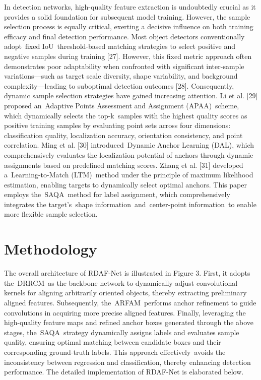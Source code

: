 \documentclass[journal]{IEEEtran}
\begin{document}
In detection networks, high-quality feature extraction is undoubtedly crucial as it provides a solid foundation for subsequent model training. However, the sample selection process is equally critical, exerting a decisive influence on both training efficacy and final detection performance. Most object detectors conventionally adopt fixed IoU threshold-based matching strategies to select positive and negative samples during training [27]. However, this fixed metric approach often demonstrates poor adaptability when confronted with significant inter-sample variations—such as target scale diversity, shape variability, and background complexity—leading to suboptimal detection outcomes [28]. Consequently, dynamic sample selection strategies have gained increasing attention. Li et al. [29] proposed an Adaptive Points Assessment and Assignment (APAA) scheme, which dynamically selects the top-k samples with the highest quality scores as positive training samples by evaluating point sets across four dimensions: classification quality, localization accuracy, orientation consistency, and point correlation. Ming et al. [30] introduced Dynamic Anchor Learning (DAL), which comprehensively evaluates the localization potential of anchors through dynamic assignments based on predefined matching scores. Zhang et al. [31] developed a Learning-to-Match (LTM) method under the principle of maximum likelihood estimation, enabling targets to dynamically select optimal anchors. This paper employs the SAQA method for label assignment, which comprehensively integrates the target's shape information and center-point information to enable more flexible sample selection.

\section{ Methodology }

The overall architecture of RDAF-Net is illustrated in Figure 3. First, it adopts the DRRCM as the backbone network to dynamically adjust convolutional kernels for aligning arbitrarily oriented objects, thereby extracting preliminary aligned features. Subsequently, the ARFAM performs anchor refinement to guide convolutions in acquiring more precise aligned features. Finally, leveraging the high-quality feature maps and refined anchor boxes generated through the above stages, the SAQA strategy dynamically assigns labels and evaluates sample quality, ensuring optimal matching between candidate boxes and their corresponding ground-truth labels. This approach effectively avoids the inconsistency between regression and classification, thereby enhancing detection performance. The detailed implementation of RDAF-Net is elaborated below.
\end{document}
